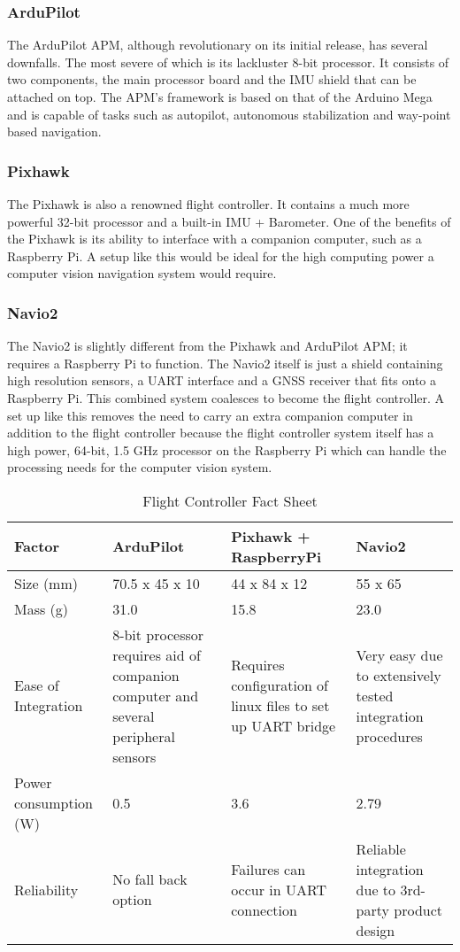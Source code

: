 		\subsubsection{ArduPilot}
			The ArduPilot APM, although revolutionary on its initial release, has several downfalls. The most severe of which is its lackluster 8-bit processor. It consists of two components, the main processor board and the IMU shield that can be attached on top. The APM’s framework is based on that of the Arduino Mega and is capable of tasks such as autopilot, autonomous stabilization and way-point based navigation.

		\subsubsection{Pixhawk}
			The Pixhawk is also a renowned flight controller. It contains a much more powerful 32-bit processor and a built-in IMU + Barometer. One of the benefits of the Pixhawk is its ability to interface with a companion computer, such as a Raspberry Pi. A setup like this would be ideal for the high computing power a computer vision navigation system would require.

		\subsubsection{Navio2}
			The Navio2 is slightly different from the Pixhawk and ArduPilot APM; it requires a Raspberry Pi to function. The Navio2 itself is just a shield containing high resolution sensors, a UART interface and a GNSS receiver that fits onto a Raspberry Pi. This combined system coalesces to become the flight controller. A set up like this removes the need to carry an extra companion computer in addition to the flight controller because the flight controller system itself has a high power, 64-bit, 1.5 GHz processor on the Raspberry Pi which can handle the processing needs for the computer vision system.

		\begin{table}[H]
			\centering
			\caption{Flight Controller Fact Sheet}
			\label{tab: flight controller}
			\begin{tabularx}{1\linewidth}{X X X X}
				\toprule
				Factor & ArduPilot & Pixhawk + RaspberryPi & Navio2 \\
			   \midrule
			   	Size (mm) & 70.5 x 45 x 10 & 44 x 84 x 12 & 55 x 65 \\
				Mass (g) & 31.0 & 15.8 & 23.0 \\
				Ease of Integration & 8-bit processor requires aid of companion \mbox{computer} and several peripheral sensors & Requires configuration of linux files to set up UART bridge & Very easy due to extensively tested integration procedures\\
				Power \newline consumption (W) & 0.5 & 3.6 & 2.79 \\
				Reliability & No fall back option & Failures can occur in UART connection & Reliable integration due to 3rd-party product \mbox{design} \\
				\bottomrule
			\end{tabularx}
		\end{table}